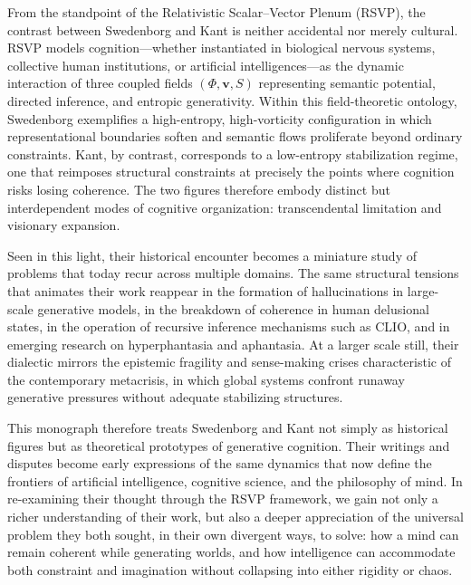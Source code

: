 \documentclass[12pt]{article}
\begin{document}
From the standpoint of the Relativistic Scalar--Vector Plenum (RSVP), the 
contrast between Swedenborg and Kant is neither accidental nor merely cultural.  
RSVP models cognition—whether instantiated in biological nervous systems, 
collective human institutions, or artificial intelligences—as the dynamic 
interaction of three coupled fields $(\Phi, \mathbf{v}, S)$ representing 
semantic potential, directed inference, and entropic generativity.  
Within this field-theoretic ontology, Swedenborg exemplifies a high-entropy, 
high-vorticity configuration in which representational boundaries soften and 
semantic flows proliferate beyond ordinary constraints. Kant, by contrast, 
corresponds to a low-entropy stabilization regime, one that reimposes structural 
constraints at precisely the points where cognition risks losing coherence.  
The two figures therefore embody distinct but interdependent modes of cognitive 
organization: transcendental limitation and visionary expansion.

Seen in this light, their historical encounter becomes a miniature study of 
problems that today recur across multiple domains. The same structural tensions 
that animates their work reappear in the formation of hallucinations in 
large-scale generative models, in the breakdown of coherence in human 
delusional states, in the operation of recursive inference mechanisms such as 
CLIO, and in emerging research on hyperphantasia and aphantasia.  
At a larger scale still, their dialectic mirrors the epistemic fragility and 
sense-making crises characteristic of the contemporary metacrisis, in which 
global systems confront runaway generative pressures without adequate 
stabilizing structures.

This monograph therefore treats Swedenborg and Kant not simply as historical 
figures but as theoretical prototypes of generative cognition. Their writings 
and disputes become early expressions of the same dynamics that now define the 
frontiers of artificial intelligence, cognitive science, and the philosophy of 
mind. In re-examining their thought through the RSVP framework, we gain not 
only a richer understanding of their work, but also a deeper appreciation of 
the universal problem they both sought, in their own divergent ways, to solve:  
how a mind can remain coherent while generating worlds, and how intelligence can 
accommodate both constraint and imagination without collapsing into either 
rigidity or chaos.


\newpage
\end{document}

